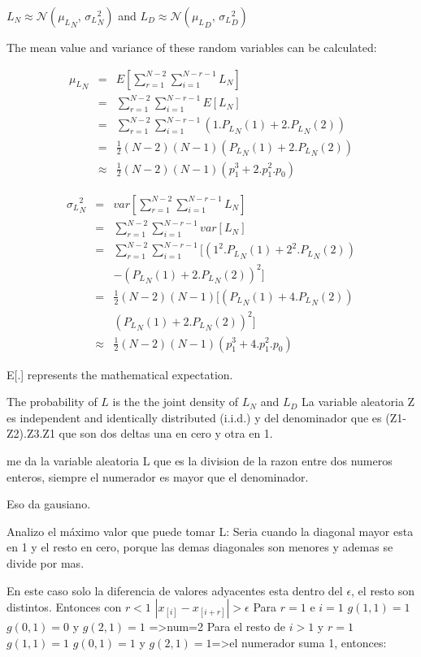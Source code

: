 \documentclass[lettersize,journal]{IEEEtran}
\begin{document}
$L_N \approx \mathcal{N}({\mu_L}_N,\,{\sigma_L}_N^{2})$ and $L_D \approx \mathcal{N}({\mu_L}_D,\,{\sigma_L}_D^{2})$

The mean value and variance of these random variables can be calculated:

\begin{eqnarray*}
{\mu_L}_N &= &E[\sum_{r=1} ^{N-2} \sum_{i=1} ^{N-r-1} L_N]\\
& =&\sum_{r=1} ^{N-2} \sum_{i=1} ^{N-r-1} E[L_N]\\
&=&\sum_{r=1} ^{N-2} \sum_{i=1} ^{N-r-1} (1.{P_L}_N(1)+2.{P_L}_N(2))\\
&=&\frac{1}{2}(N-2)(N-1)({P_L}_N(1)+2.{P_L}_N(2))\\
&\approx&\frac{1}{2}(N-2)(N-1)(p_1^3+2.p_1^2.p_0)
\end{eqnarray*}

\begin{eqnarray*}
{\sigma_L}_N^2 &= &var[\sum_{r=1} ^{N-2} \sum_{i=1} ^{N-r-1} L_N]\\
& =&\sum_{r=1} ^{N-2} \sum_{i=1} ^{N-r-1} var[L_N]\\
&=&\sum_{r=1} ^{N-2} \sum_{i=1} ^{N-r-1} [(1^2.{P_L}_N(1)+2^2.{P_L}_N(2))\\
& & -({P_L}_N(1)+2.{P_L}_N(2))^2]\\
&=&\frac{1}{2}(N-2)(N-1)[({P_L}_N(1)+4.{P_L}_N(2))\\
& & ({P_L}_N(1)+2.{P_L}_N(2))^2]\\
&\approx&\frac{1}{2}(N-2)(N-1)(p_1^3+4.p_1^2.p_0)
\end{eqnarray*}

E[.] represents the mathematical expectation.

The probability of $L$ is the the joint density of $L_N$ and $L_D$ 
 La variable aleatoria 
 Z es independent and identically distributed (i.i.d.) 
y del denominador que es (Z1-Z2).Z3.Z1 que son dos deltas una en cero y otra en 1.

me da la variable aleatoria L que es la division de la razon entre dos numeros enteros, siempre el numerador es mayor que el denominador.

Eso da gausiano.

Analizo el máximo valor que puede tomar L:
Seria cuando la diagonal mayor esta en 1 y el resto en cero, porque las demas diagonales son menores y ademas se divide por mas.

En este caso solo la diferencia de valores adyacentes esta dentro del  $\epsilon$, el resto son distintos. Entonces con $r<1$ $|x_{[i]}-x_{[i+r]}| >\epsilon$
Para $r=1$ e $i=1$ $g(1,1)=1$ $g(0,1)=0$ y $g(2,1)=1$ =>num=2
Para el resto de $i>1$ y $r=1$ $g(1,1)=1$ $g(0,1)=1$ y $g(2,1)=1$=>el numerador suma 1, entonces:
 
\end{document}
